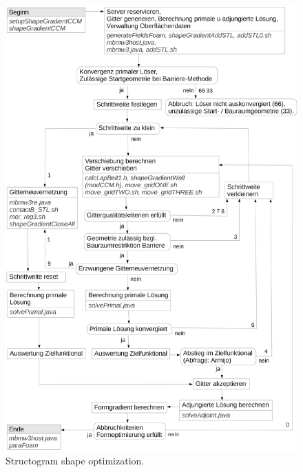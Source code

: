 \documentclass[oneside]{article}
\numberwithin{equation}{section}
\numberwithin{figure}{section}
\numberwithin{figure}{section}
\begin{document}
\begin{figure}[htbp]
    \centering
    \includegraphics[scale=0.47]{struktogramm16.png}
    \caption{Structogram shape optimization.} 
    \label{fig:struktogramm}
\end{figure}


\printbibliography[heading=bibintoc]
\end{document}
